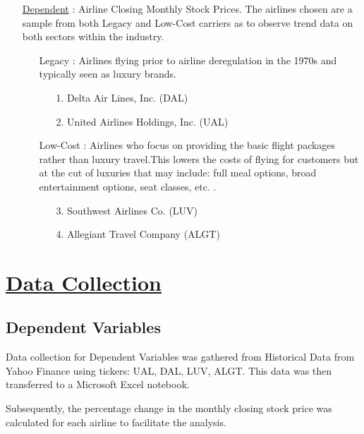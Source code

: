 \documentclass[12pt]{report}
\begin{document}
\begin{enumerate}
    \item[\underline{Dependent}]: Airline Closing Monthly Stock Prices.
    The airlines chosen are a sample from both Legacy and Low-Cost carriers as to observe trend data on both sectors within the industry.
    \begin{enumerate}
        \item[Legacy]: Airlines flying prior to airline deregulation in the 1970s and typically seen as luxury brands.
            \begin{enumerate}
                \item[1.]Delta Air Lines, Inc. (DAL)
                \item[2.]United Airlines Holdings, Inc. (UAL)
            \end{enumerate}
        \item[Low-Cost]: Airlines who focus on providing the basic flight packages rather than luxury travel.This lowers the costs of flying for customers but at the cut of luxuries that may include: full meal options, broad entertainment options, seat classes, etc. .
            \begin{enumerate}
                \item[3.]Southwest Airlines Co. (LUV)
                \item[4.]Allegiant Travel Company (ALGT)
            \end{enumerate}
    \end{enumerate}


\end{enumerate}

\section*{\underline{Data Collection}}


\subsection*{Dependent Variables}
Data collection for Dependent Variables was gathered from Historical Data from Yahoo Finance using tickers: UAL, DAL, LUV, ALGT. This data was then transferred to a Microsoft Excel notebook.


Subsequently, the percentage change
in the monthly closing stock price was calculated for each airline to
facilitate the analysis.
\end{document}
